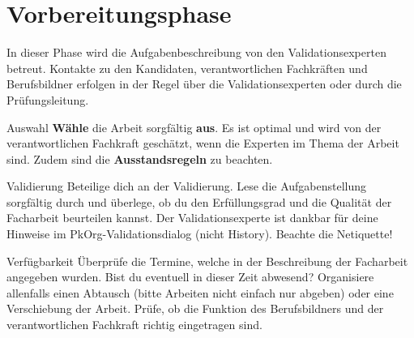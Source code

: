\section{Vorbereitungsphase}
In dieser Phase wird die Aufgabenbeschreibung von den Validationsexperten betreut. Kontakte zu den Kandidaten, verantwortlichen Fachkräften und Berufsbildner erfolgen in der Regel über die Validationsexperten oder durch die Prüfungsleitung.

\begin{taskitemwithoutcomment}{Auswahl}
  \textbf{Wähle} die Arbeit sorgfältig \textbf{aus}. Es ist optimal und wird von der verantwortlichen Fachkraft geschätzt, wenn die Experten im Thema der Arbeit sind. Zudem sind die \textbf{Ausstandsregeln} zu beachten.
\end{taskitemwithoutcomment}
\begin{taskitem}{Validierung}
  Beteilige dich an der Validierung. Lese die Aufgabenstellung sorgfältig durch und überlege, ob du den Erfüllungsgrad und die Qualität der Facharbeit beurteilen kannst. Der Validationsexperte ist dankbar für deine Hinweise im PkOrg-Validationsdialog (nicht History). Beachte die Netiquette!
\end{taskitem}
\begin{taskitem}{Verfügbarkeit}
  Überprüfe die Termine, welche in der Beschreibung der Facharbeit angegeben wurden. Bist du eventuell in dieser Zeit abwesend? Organisiere allenfalls einen Abtausch (bitte Arbeiten nicht einfach nur abgeben) oder eine Verschiebung der Arbeit. Prüfe, ob die Funktion des Berufsbildners und der verantwortlichen Fachkraft richtig eingetragen sind.
\end{taskitem}
